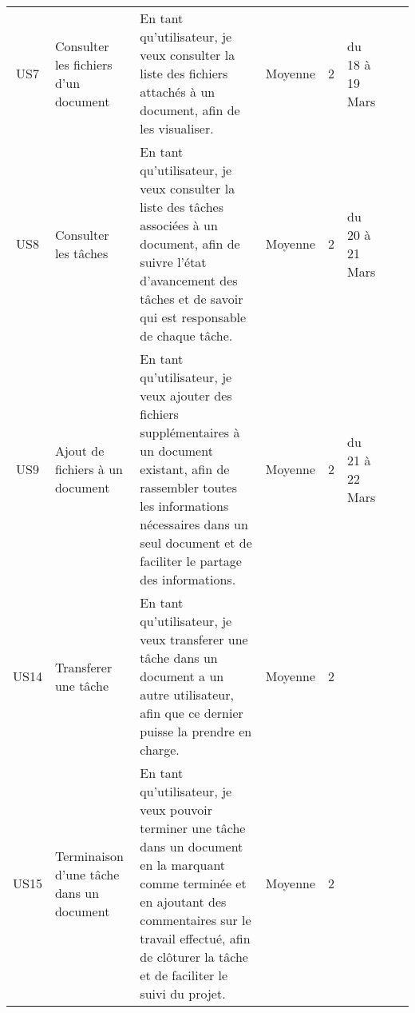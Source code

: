 \begin{landscape}
\begin{adjustwidth}{-1cm}{}
\begin{longtable}{|c|p{3cm}|p{8cm}|c|c|p{2cm}|p{2cm}|c|}
    \cline{1-6}
    
    US7&Consulter les fichiers d'un document&En tant qu'utilisateur, je veux consulter la liste des fichiers attachés à un document, afin de les visualiser. &Moyenne&2&du 18 à 19 Mars&&\\
    
    \cline{1-6}
    US8&Consulter les tâches&En tant qu'utilisateur, je veux consulter la liste des tâches associées à un document, afin de suivre l'état d'avancement des tâches et de savoir qui est responsable de chaque tâche. &Moyenne&2&du 20 à 21 Mars&&\\


    \cline{1-6}
    US9&Ajout de fichiers à un document&En tant qu'utilisateur, je veux ajouter des fichiers supplémentaires à un document existant, afin de rassembler toutes les informations nécessaires dans un seul document et de faciliter le partage des informations.&Moyenne&2&du 21 à 22 Mars&&\\
    \cline{1-6}



    \cline{1-6}
    US14&Transferer une tâche&En tant qu'utilisateur, je veux transferer une tâche dans un document a un autre utilisateur, afin que ce dernier puisse la prendre en charge.&Moyenne&2&&&\\
    \cline{1-6}
    US15&Terminaison d'une tâche dans un document&En tant qu'utilisateur, je veux pouvoir terminer une tâche dans un document en la marquant comme terminée et en ajoutant des commentaires sur le travail effectué, afin de clôturer la tâche et de faciliter le suivi du projet. &Moyenne&2&&&\\




\end{longtable}
\end{adjustwidth}
\end{landscape}
